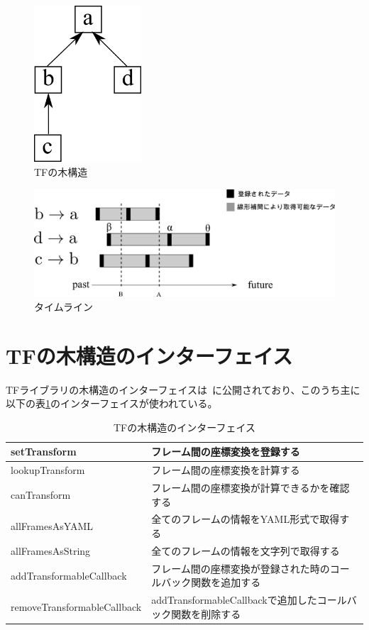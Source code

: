 \documentclass[a4paper]{jreport}	%
\begin{document}
\begin{figure}[h] 
\centering
\includegraphics[width=4cm]{sample-tree}	
\caption{TFの木構造}
\label{fig:sample-tree}
\end{figure}

\begin{figure}[h] 
\centering
\includegraphics[width=15cm]{general-timeline.png}
\caption{タイムライン}
\label{fig:general-timeline}
\end{figure}

\section{TFの木構造のインターフェイス}
\label{section:tf-interface}

TFライブラリの木構造のインターフェイスは~\cite{buffer-core}に公開されており、このうち主に以下の表\ref{table:tf-interface}のインターフェイスが使われている。

\begin{table}[h!]
\centering
\begin{tabular}{ | m{5cm} | m{5cm} | } 
  \hline
  setTransform & フレーム間の座標変換を登録する \\ 
  \hline
  lookupTransform & フレーム間の座標変換を計算する \\ 
  \hline
  canTransform & フレーム間の座標変換が計算できるかを確認する \\ 
  \hline
  allFramesAsYAML & 全てのフレームの情報をYAML形式で取得する \\
  \hline
  allFramesAsString & 全てのフレームの情報を文字列で取得する \\
  \hline
  addTransformableCallback & フレーム間の座標変換が登録された時のコールバック関数を追加する \\
  \hline
  removeTransformableCallback & addTransformableCallbackで追加したコールバック関数を削除する \\
  \hline
\end{tabular}	
\caption{TFの木構造のインターフェイス}
\label{table:tf-interface}
\end{table}
\end{document}
